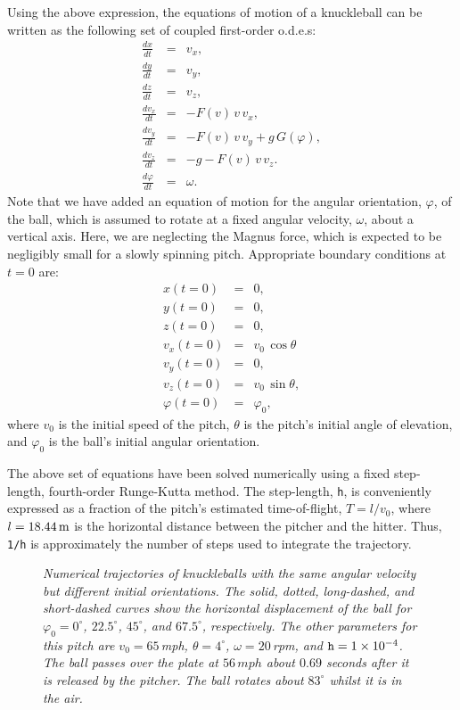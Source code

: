 Using the above expression, the equations of motion of a knuckleball
can be written as the following set of coupled first-order o.d.e.s:
\begin{eqnarray}
\frac{dx}{dt} &=& v_x,\\[0.5ex]
\frac{dy}{dt} &=& v_y,\\[0.5ex]
\frac{dz}{dt} &=& v_z,\\[0.5ex]
\frac{dv_x}{dt} &=& - F(v)\,v\,v_x,\\[0.5ex]
\frac{dv_y}{dt} &=& - F(v)\,v\,v_y  + g\,G(\varphi),\\[0.5ex]
\frac{dv_z}{dt} &=& -g - F(v)\,v\,v_z.\\[0.5ex]
\frac{d\varphi}{dt} &=& \omega.
\end{eqnarray}
Note that we have added an equation of motion for the angular orientation, $\varphi$, of the
ball, which  is assumed to rotate at a fixed angular velocity, $\omega$, about a vertical
axis. Here, we are neglecting the Magnus force, which is expected to be negligibly small
for a slowly spinning pitch.
 Appropriate boundary conditions at $t=0$ are:
\begin{eqnarray}
x(t=0) &=& 0,\\[0.5ex]
y(t=0) &=& 0,\\[0.5ex]
z(t=0) &=& 0,\\[0.5ex]
v_x(t=0) &=& v_0\,\cos\theta\\[0.5ex]
v_y(t=0) &=& 0,\\[0.5ex]
v_z(t=0) &=& v_0\,\sin\theta,\\[0.5ex]
\varphi(t=0) &=& \varphi_0,
\end{eqnarray}
where $v_0$ is the initial speed of the pitch, $\theta$ is the pitch's  initial
angle of elevation, and $\varphi_0$ is the ball's initial angular orientation.

The above set of equations have been solved numerically using a fixed step-length, fourth-order
Runge-Kutta method. The step-length, {\tt h}, is conveniently expressed as a fraction of the
pitch's  estimated
time-of-flight, $T = l/v_0$, where $l=18.44\,{\rm m}$ is the horizontal
distance between the pitcher and the hitter. Thus, {\tt 1/h} is approximately the number
of steps used to integrate the trajectory. 

\begin{figure}
\epsfysize=3.5in
\centerline{}
\caption{\em Numerical trajectories of  knuckleballs with the same
angular velocity but different initial orientations. The solid, dotted, long-dashed, and short-dashed
curves show the horizontal displacement of the ball for $\varphi_0 = 0^\circ$,
$22.5^\circ$, $45^\circ$, and $67.5^\circ$, respectively. The
other parameters for this pitch are $v_0=65$\,mph, $\theta = 4^\circ$, $\omega
=20$\,rpm, and ${\tt h}=1\times 10^{-4}$. 
The ball passes over the plate at $56\,mph$ about $0.69$ seconds after
it is released by the pitcher. The ball rotates about $83^\circ$ whilst it is
in the air.
 }\label{fknuckle}
\end{figure}

